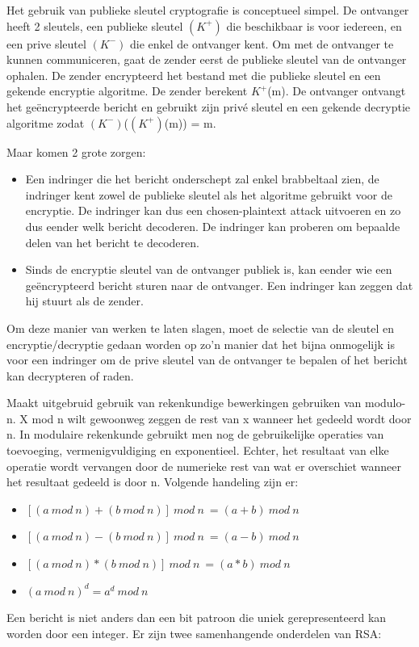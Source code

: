Het gebruik van publieke sleutel cryptografie is conceptueel simpel. De ontvanger heeft 2 sleutels, een publieke sleutel $(K^+)$ die beschikbaar is voor iedereen, en een prive sleutel $(K^-)$ die enkel de ontvanger kent. Om met de ontvanger te kunnen communiceren, gaat de zender eerst de publieke sleutel van de ontvanger ophalen. De zender encrypteerd het bestand met die publieke sleutel en een gekende encryptie algoritme. De zender berekent $K^+$(m). De ontvanger ontvangt het geëncrypteerde bericht en gebruikt zijn privé sleutel en een gekende decryptie algoritme zodat $(K^-)$($(K^+)$(m)) = m.

Maar komen 2 grote zorgen:
\begin{itemize}
\item Een indringer die het bericht onderschept zal enkel brabbeltaal zien, de indringer kent zowel de publieke sleutel als het algoritme gebruikt voor de encryptie. De indringer kan dus een chosen-plaintext attack uitvoeren en zo dus eender welk bericht decoderen. De indringer kan proberen om bepaalde delen van het bericht te decoderen.
\item Sinds de encryptie sleutel van de ontvanger publiek is, kan eender wie een geëncrypteerd bericht sturen naar de ontvanger. Een indringer kan zeggen dat hij stuurt als de zender.

\end{itemize}

Om deze manier van werken te laten slagen, moet de selectie van de sleutel en encryptie/decryptie gedaan worden op zo’n manier dat het bijna onmogelijk is voor een indringer om de prive sleutel van de ontvanger te bepalen of het bericht kan decrypteren of raden.


Maakt uitgebruid gebruik van rekenkundige bewerkingen gebruiken van modulo-n.
X mod n wilt gewoonweg zeggen de rest van x wanneer het gedeeld wordt door n. In modulaire rekenkunde gebruikt men nog de gebruikelijke operaties van toevoeging, vermenigvuldiging en exponentieel. Echter, het resultaat van elke operatie wordt vervangen door de numerieke rest van wat er overschiet wanneer het resultaat gedeeld is door n.
Volgende handeling zijn er:

\begin{itemize}

\item $[(a\ mod\ n)  + (b\ mod\ n)] \ mod\ n\ = (a + b)\ mod\ n$
\item $[(a\ mod\ n) - (b\ mod\ n)] \ mod\ n\ = (a - b)\ mod\ n$
\item $[(a\ mod\ n) * (b\ mod\ n)] \ mod\ n\ = (a * b)\ mod\ n$
\item $(a\ mod\ n)^d = a^d\ mod\ n$
\end{itemize}
Een bericht is niet anders dan een bit patroon die uniek gerepresenteerd kan worden door een integer. Er zijn twee samenhangende onderdelen van RSA:

